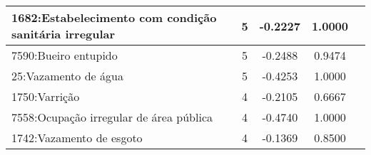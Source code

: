 \begin{table}[htbp]
\begin{tabular}{|l|c|c|c|c|}
		\hline
		1682:Estabelecimento com condição sanitária irregular & 5                & -0.2227        & 1.0000           \\
		\hline
		7590:Bueiro entupido                                  & 5                & -0.2488        & 0.9474           \\
		\hline
		25:Vazamento de água                                  & 5                & -0.4253        & 1.0000           \\
		\hline
		1750:Varrição                                         & 4                & -0.2105        & 0.6667           \\
		\hline
		7558:Ocupação irregular de área pública               & 4                & -0.4740        & 1.0000           \\
		\hline
		1742:Vazamento de esgoto                              & 4                & -0.1369        & 0.8500           \\
		\hline
	\end{tabular}
\end{table}

